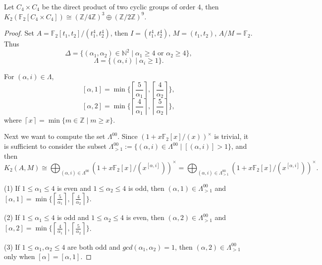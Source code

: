 \begin{theorem}
	Let $C_4\times C_4$ be the direct product of two cyclic groups of order $4$, then $K_2(\mathbb{F}_2[C_4\times C_4])  \cong (\mathbb{Z}/4 \mathbb{Z})^3 \oplus (\mathbb{Z}/2 \mathbb{Z})^9$.
\end{theorem}
\begin{proof}
	Set $A=\mathbb{F}_2[t_1,t_2]/(t_1^4,t_2^4)$, then $I=(t_1^4,t_2^4)$, $M=(t_1,t_2)$, $A/M=\mathbb{F}_2$. Thus 
	\[\Delta =\{(\alpha_1,\alpha_2)\in\mathbb{N}^2\mid  \alpha_1 \geq 4 \text{ or } \alpha_2 \geq 4\},\] 
	\[\Lambda =\{(\alpha,i)\mid \alpha_i \geq 1\}.\]

	For $(\alpha,i)\in \Lambda$, 
	\[ [\alpha,1]=\min\{\left \lceil \frac{5}{\alpha_1} \right \rceil, \left \lceil \frac{4}{\alpha_2} \right \rceil \}, \]
	\[ [\alpha,2]=\min\{\left \lceil \frac{4}{\alpha_1} \right \rceil, \left \lceil \frac{5}{\alpha_2} \right \rceil \},\]
	where $\left \lceil x \right \rceil=\min \{m\in \mathbb{Z}\mid m\geq x\}$.

	Next we want to compute the set $\Lambda^{00}$. Since $(1+x\mathbb{F}_2[x]/(x))^{\times}$ is trivial, it is sufficient to consider the subset $\Lambda^{00}_{>1}:=\{(\alpha,i)\in \Lambda^{00}\mid [(\alpha,i)]>1\}$, and then 
	\[K_2(A,M)\cong \bigoplus_{(\alpha,i)\in\Lambda^{00}}(1+x \mathbb{F}_2[x]/(x^{[\alpha,i]}))^{\times} = \bigoplus_{(\alpha,i)\in\Lambda^{00}_{>1}}(1+x \mathbb{F}_2[x]/(x^{[\alpha,i]}))^{\times}.\]

	(1) If $1\leq \alpha_1 \leq 4$ is even and $1\leq \alpha_2 \leq 4$ is odd, then $(\alpha,1)\in \Lambda^{00}_{>1}$ and $[\alpha,1]=\min\{\left \lceil \frac{5}{\alpha_1} \right \rceil, \left \lceil \frac{4}{\alpha_2} \right \rceil \}$.

	(2) If $1\leq \alpha_1 \leq 4$ is odd and $1\leq \alpha_2 \leq 4$ is even, then $(\alpha,2)\in \Lambda^{00}_{>1}$ and $[\alpha,2]=\min\{\left \lceil \frac{4}{\alpha_1} \right \rceil, \left \lceil \frac{5}{\alpha_2} \right \rceil \}$. 

	(3) If $1\leq \alpha_1,\alpha_2 \leq 4$ are both odd and $gcd(\alpha_1,\alpha_2)=1$, then $(\alpha,2)\in \Lambda^{00}_{>1}$ only when $[\alpha]=[\alpha,1]$.


\end{proof}
